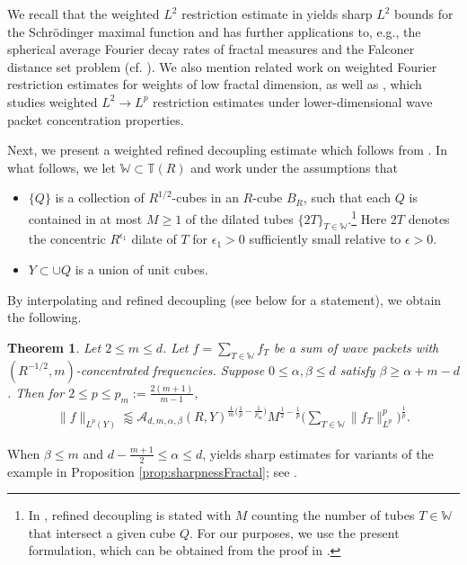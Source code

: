 \documentclass[11pt]{amsart}
\newtheorem{theorem}{Theorem}[section]
\theoremstyle{definition}
\theoremstyle{remark}
\numberwithin{equation}{section}
\newcommand{\W}{\mathbb{W}}
\newcommand{\T}{\mathbb{T}}
\newcommand{\less}{\lessapprox}
\newcommand{\eps}{\epsilon}
\begin{document}
We recall that the weighted $L^2$ restriction estimate in \cite{DZ} yields sharp $L^2$ bounds for the Schr\"odinger maximal function and has further applications to, e.g., the spherical average Fourier decay rates of fractal measures and the Falconer distance set problem (cf.  \cite{Carleson, falconer_1985, Mattila_Sph}). We also mention related work  \cite{Shayya2} on weighted Fourier restriction estimates for weights of low fractal dimension, as well as \cite{du2024Lpweighted}, which studies weighted $L^2\to L^p$ restriction estimates under lower-dimensional wave packet concentration properties.

Next, we present a weighted refined decoupling estimate which follows from  . In what follows, we let $\W \subset \T(R)$ and work under the assumptions that 
\begin{itemize}
	\item $\{ Q\}$ is a collection of $R^{1/2}$-cubes in an $R$-cube $B_R$, such that each $Q$ is contained in at most $M\geq 1$ of the dilated tubes $\{ 2T\}_{T\in \W}$.\footnote{In \cite{GIOW,du2023weighted}, refined decoupling is stated with $M$ counting
		the number of tubes $T\in\W$ that intersect a given cube $Q$. For our purposes,
		we use the present formulation, which can be obtained from the proof in
		\cite{GIOW,du2023weighted}.}  Here  $2T$ denotes the concentric $R^{\eps_1}$ dilate of $T$ for  $\eps_1>0$ sufficiently small relative to  $\eps>0$.
	\item $Y\subset \cup Q$ is a union of unit cubes. 
\end{itemize}

By interpolating   and  refined decoupling \cite{GIOW, du2023weighted} (see  below for a statement), we obtain the following.
\begin{theorem}\label{thm:LpWeightedDecouplingConcentratedRefined}
	Let $2\leq m \leq d$. Let $f = \sum_{T \in \W} f_T$ be a sum of wave packets with $(R^{-1/2}, m)$-concentrated frequencies. Suppose  $0\leq \alpha, \beta \leq d$ satisfy $\beta \geq \alpha +m - d$. Then for $2\leq p \leq p_m:= \frac{2(m+1)}{m-1}$, 
	\begin{align*}
		\| f \|_{L^p(Y)} \less \mathcal{A}_{d,m,\alpha,\beta}(R, Y)^{\frac{1}{m}\big(\frac{1}{p}-\frac{1}{p_m}\big)} 
		M^{\frac{1}{2}-\frac{1}{p}}   \bigg( \sum_{T\in \W} \| f_T \|_{L^p}^p \bigg)^{\frac{1}{p}}.
	\end{align*}
\end{theorem}
When $\beta \leq m$ and $d-\frac{m+1}{2}\leq \alpha \leq d$,  yields sharp estimates for variants of the example in Proposition \ref{prop:sharpnessFractal}; see .
\end{document}

